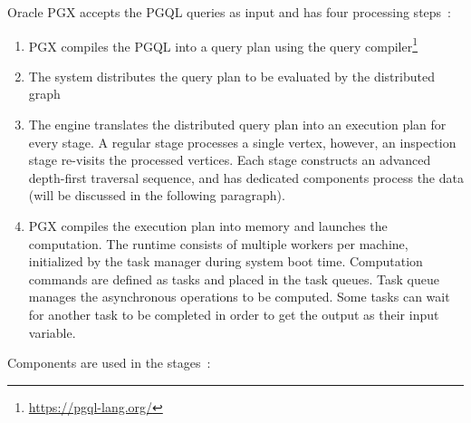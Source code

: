 Oracle PGX accepts the PGQL queries as input and has four processing steps~\cite{DBLP:conf/grades/RothTHCPMH17}:

\begin{enumerate}
  \item PGX compiles the PGQL into a query plan using the query compiler\footnote{\url{https://pgql-lang.org/}}
  \item The system distributes the query plan to be evaluated by the distributed graph
  \item The engine translates the distributed query plan into an execution plan for every stage.
  A regular stage processes a single vertex, however, an inspection stage re-visits the processed vertices.
  Each stage constructs an advanced depth-first traversal sequence, and has dedicated components process the data (will be discussed in the following paragraph).
  \item PGX compiles the execution plan into memory and launches the computation.
  The runtime consists of multiple workers per machine, initialized by the task manager during system boot time.
  Computation commands are defined as tasks and placed in the task queues.
  Task queue manages the asynchronous operations to be computed.
  Some tasks can wait for another task to be completed in order to get the output as their input variable.
\end{enumerate}

Components are used in the stages~\cite{DBLP:conf/grades/RothTHCPMH17}:

